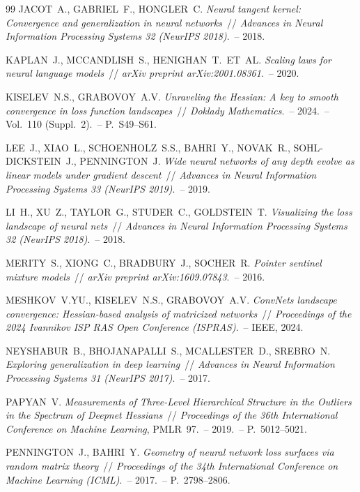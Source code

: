 \documentclass[11pt]{ubs}
\begin{document}
\begin{thebibliography}{99}
{\MakeUppercase{Jacot~A., Gabriel~F., Hongler~C.}}
\textit{Neural tangent kernel: Convergence and generalization in neural networks}~//
\emph{Advances in Neural Information Processing Systems 32 (NeurIPS 2018)}.~-- 2018.

{\MakeUppercase{Kaplan~J., McCandlish~S., Henighan~T.~et~al.}}
\textit{Scaling laws for neural language models}~//
\emph{arXiv preprint arXiv:2001.08361}.~-- 2020.

{\MakeUppercase{Kiselev~N.S., Grabovoy~A.V.}}
\textit{Unraveling the Hessian: A key to smooth convergence in loss function landscapes}~//
\emph{Doklady Mathematics}.~-- 2024.~-- Vol.~110 (Suppl.~2).~-- P.~S49--S61.

{\MakeUppercase{Lee~J., Xiao~L., Schoenholz~S.S., Bahri~Y., Novak~R., Sohl-Dickstein~J., Pennington~J.}}
\textit{Wide neural networks of any depth evolve as linear models under gradient descent}~//
\emph{Advances in Neural Information Processing Systems 33 (NeurIPS 2019)}.~-- 2019.

{\MakeUppercase{Li~H., Xu~Z., Taylor~G., Studer~C., Goldstein~T.}}
\textit{Visualizing the loss landscape of neural nets}~//
\emph{Advances in Neural Information Processing Systems 32 (NeurIPS 2018)}.~-- 2018.

{\MakeUppercase{Merity~S., Xiong~C., Bradbury~J., Socher~R.}}
\textit{Pointer sentinel mixture models}~//
\emph{arXiv preprint arXiv:1609.07843}.~-- 2016.

{\MakeUppercase{Meshkov~V.Yu., Kiselev~N.S., Grabovoy~A.V.}}
\textit{ConvNets landscape convergence: Hessian-based analysis of matricized networks}~//
\emph{Proceedings of the 2024 Ivannikov ISP RAS Open Conference (ISPRAS)}.~-- IEEE, 2024.

{\MakeUppercase{Neyshabur~B., Bhojanapalli~S., McAllester~D., Srebro~N.}}
\textit{Exploring generalization in deep learning}~//
\emph{Advances in Neural Information Processing Systems 31 (NeurIPS 2017)}.~-- 2017.

{\MakeUppercase{Papyan~V.}}
\textit{Measurements of Three-Level Hierarchical Structure in the Outliers in the Spectrum of Deepnet Hessians}~//
\emph{Proceedings of the 36th International Conference on Machine Learning}, PMLR~97.~-- 2019.~-- P.~5012--5021.

{\MakeUppercase{Pennington~J., Bahri~Y.}}
\textit{Geometry of neural network loss surfaces via random matrix theory}~//
\emph{Proceedings of the 34th International Conference on Machine Learning (ICML)}.~-- 2017.~-- P.~2798--2806.


\end{thebibliography}
\end{document}

